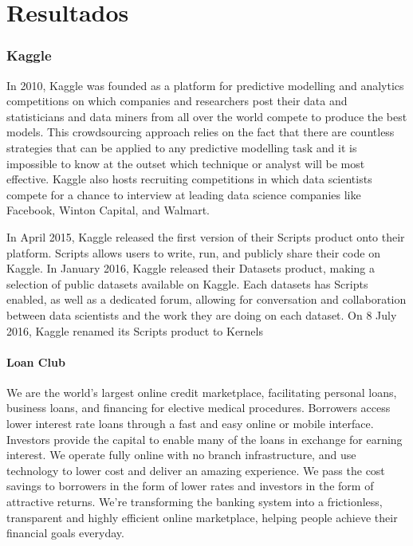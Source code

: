 \part{Resultados}

\section{Kaggle}

In 2010, Kaggle was founded as a platform for predictive modelling and analytics competitions on which companies and researchers post their data and statisticians and data miners from all over the world compete to produce the best models. This crowdsourcing approach relies on the fact that there are countless strategies that can be applied to any predictive modelling task and it is impossible to know at the outset which technique or analyst will be most effective. Kaggle also hosts recruiting competitions in which data scientists compete for a chance to interview at leading data science companies like Facebook, Winton Capital, and Walmart.

In April 2015, Kaggle released the first version of their Scripts product onto their platform. Scripts allows users to write, run, and publicly share their code on Kaggle. In January 2016, Kaggle released their Datasets product, making a selection of public datasets available on Kaggle. Each datasets has Scripts enabled, as well as a dedicated forum, allowing for conversation and collaboration between data scientists and the work they are doing on each dataset. On 8 July 2016, Kaggle renamed its Scripts product to Kernels

\subsection{Loan Club}

We are the world’s largest online credit marketplace, facilitating personal loans, business loans, and financing for elective medical procedures. Borrowers access lower interest rate loans through a fast and easy online or mobile interface. Investors provide the capital to enable many of the loans in exchange for earning interest. We operate fully online with no branch infrastructure, and use technology to lower cost and deliver an amazing experience. We pass the cost savings to borrowers in the form of lower rates and investors in the form of attractive returns. We’re transforming the banking system into a frictionless, transparent and highly efficient online marketplace, helping people achieve their financial goals everyday.


